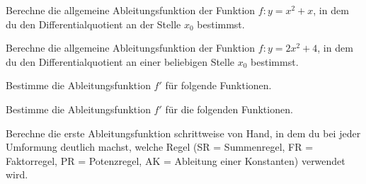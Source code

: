 \documentclass[11pt]{exam}
\begin{document}
\begin{questions}
\question[4]
Berechne die allgemeine Ableitungsfunktion der Funktion $f:y=x^2+x$, in dem du den Differentialquotient an der Stelle $x_0$ bestimmst.


\question[4]
Berechne die allgemeine Ableitungsfunktion der Funktion $f:y=2x^2+4$, in dem du den Differentialquotient an einer beliebigen Stelle $x_0$ bestimmst.

\question[6]
Bestimme die Ableitungsfunktion $f'$ für folgende Funktionen.

\question[6]
Bestimme die Ableitungsfunktion $f'$ für die folgenden Funktionen.


\noaddpoints
\question[\totalpoints] %
\addpoints
Berechne die erste Ableitungsfunktion schrittweise von Hand, in dem du bei jeder Umformung deutlich machst, welche Regel (SR = Summenregel, FR = Faktorregel, PR = Potenzregel, AK = Ableitung einer Konstanten) verwendet wird.
\begin{parts}

\end{parts}
\end{questions}
\end{document}
